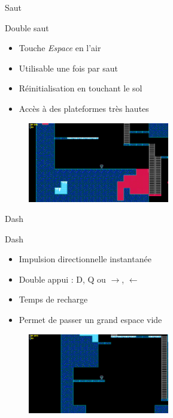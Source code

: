 \documentclass{beamer}
\begin{document}
{\begin{frame}{Saut}
    
    \begin{block}{Double saut}
        \begin{itemize}
            \item[\bullet] Touche \emph{Espace} en l'air
            \item[\bullet] Utilisable une fois par saut
            \item[\bullet] Réinitialisation en touchant le sol
            \item[\bullet] Accès à des plateformes très hautes
        \end{itemize}
    \end{block}
    \begin{figure}
        \centering
        \includegraphics[width=0.55\textwidth]{images/double_jump_ex.png}
    \end{figure}
\end{frame}

\begin{frame}{Dash}
    \begin{block}{Dash}
        \begin{itemize}
            \item[\bullet] Impulsion directionnelle instantanée
            \item[\bullet] Double appui : D, Q ou $\rightarrow$, $\leftarrow$
            \item[\bullet] Temps de recharge
            \item[\bullet] Permet de passer un grand espace vide
            
        \end{itemize}
    \end{block}
    \begin{figure}
        \centering
        \includegraphics[width=0.55\textwidth]{images/dash_ex.png}
    \end{figure}
\end{frame}

}
\end{document}
